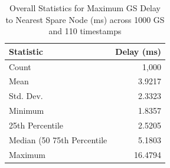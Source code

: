 \begin{table}[htbp]
\centering
\caption{Overall Statistics for Maximum GS Delay to Nearest Spare Node (ms) across 1000 GS and 110 timestamps}
\label{tab:gs_delay_overall_max_per_gs}
\begin{tabular}{lr}
\toprule
Statistic & Delay (ms) \\
\midrule
Count & 1,000 \\
Mean & 3.9217 \\
Std. Dev. & 2.3323 \\
Minimum & 1.8357 \\
25th Percentile & 2.5205 \\
Median (50%
75th Percentile & 5.1803 \\
Maximum & 16.4794 \\
\bottomrule
\end{tabular}
\end{table}
